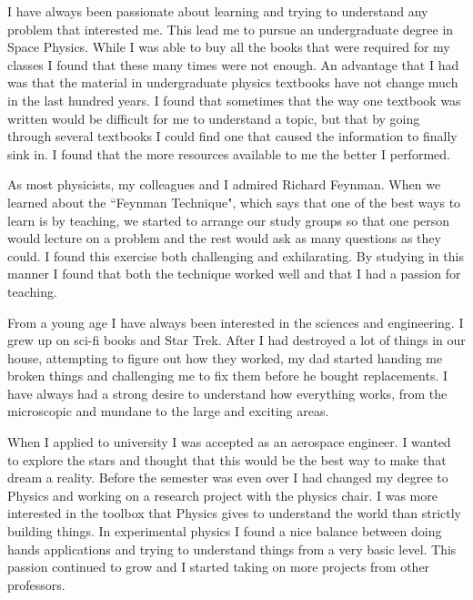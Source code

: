 \documentclass[12pt]{article}
\begin{document}
I have always been passionate about learning and trying to understand any
problem that interested me. This lead me to pursue an undergraduate degree in
Space Physics. While I was able to buy all the books that were required for my
classes I found that these many times were not enough. An advantage that I had
was that the material in undergraduate physics textbooks have not change much in
the last hundred years. I found that sometimes that the way one textbook was
written would be difficult for me to understand a topic, but that by going
through several textbooks I could find one that caused the information to
finally sink in. I found that the more resources available to me the better I
performed. 

As most physicists, my colleagues and I admired Richard Feynman. When we learned
about the ``Feynman Technique", which says that one of the best ways to learn is
by teaching, we started to arrange our study groups so that one person would
lecture on a problem and the rest would ask as many questions as they could. I
found this exercise both challenging and exhilarating. By studying in this
manner I found that both the technique worked well and that I had a passion for
teaching. 




From a young age I have always been interested in the sciences and engineering.
I grew up on sci-fi books and Star Trek. After I had destroyed a lot of things
in our house, attempting to figure out how they worked, my dad started handing
me broken things and challenging me to fix them before he bought replacements. I
have always had a strong desire to understand how everything works, from the
microscopic and mundane to the large and exciting areas. 

When I applied to university I was accepted as an aerospace engineer. I wanted
to explore the stars and thought that this would be the best way to make that
dream a reality. Before the semester was even over I had changed my degree to
Physics and working on a research project with the physics chair. I was more
interested in the toolbox that Physics gives to understand the world than
strictly building things. In experimental physics I found a nice balance between
doing hands applications and trying to understand things from a very basic
level. This passion continued to grow and I started taking on more projects from
other professors. 
\end{document}
